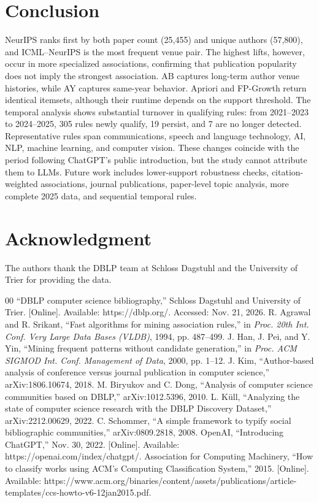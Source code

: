 \documentclass[conference]{IEEEtran}
\begin{document}
\section{Conclusion}
NeurIPS ranks first by both paper count (25,455) and unique authors (57,800), and ICML--NeurIPS is the most frequent venue pair. The highest lifts, however, occur in more specialized associations, confirming that publication popularity does not imply the strongest association. AB captures long-term author venue histories, while AY captures same-year behavior. Apriori and FP-Growth return identical itemsets, although their runtime depends on the support threshold. The temporal analysis shows substantial turnover in qualifying rules: from 2021--2023 to 2024--2025, 305 rules newly qualify, 19 persist, and 7 are no longer detected. Representative rules span communications, speech and language technology, AI, NLP, machine learning, and computer vision. These changes coincide with the period following ChatGPT's public introduction, but the study cannot attribute them to LLMs. Future work includes lower-support robustness checks, citation-weighted associations, journal publications, paper-level topic analysis, more complete 2025 data, and sequential temporal rules.

\section*{Acknowledgment}
The authors thank the DBLP team at Schloss Dagstuhl and the University of Trier for providing the data.

\begin{thebibliography}{00}
 ``DBLP computer science bibliography,'' Schloss Dagstuhl and University of Trier. [Online]. Available: https://dblp.org/. Accessed: Nov. 21, 2026.
 R. Agrawal and R. Srikant, ``Fast algorithms for mining association rules,'' in \textit{Proc. 20th Int. Conf. Very Large Data Bases (VLDB)}, 1994, pp. 487--499.
 J. Han, J. Pei, and Y. Yin, ``Mining frequent patterns without candidate generation,'' in \textit{Proc. ACM SIGMOD Int. Conf. Management of Data}, 2000, pp. 1--12.
 J. Kim, ``Author-based analysis of conference versus journal publication in computer science,'' arXiv:1806.10674, 2018.
 M. Biryukov and C. Dong, ``Analysis of computer science communities based on DBLP,'' arXiv:1012.5396, 2010.
 L. K\"ull, ``Analyzing the state of computer science research with the DBLP Discovery Dataset,'' arXiv:2212.00629, 2022.
 C. Schommer, ``A simple framework to typify social bibliographic communities,'' arXiv:0809.2818, 2008.
 OpenAI, ``Introducing ChatGPT,'' Nov. 30, 2022. [Online]. Available: https://openai.com/index/chatgpt/.
 Association for Computing Machinery, ``How to classify works using ACM's Computing Classification System,'' 2015. [Online]. Available: https://www.acm.org/binaries/content/assets/publications/article-templates/ccs-howto-v6-12jan2015.pdf.
\end{thebibliography}
\end{document}

